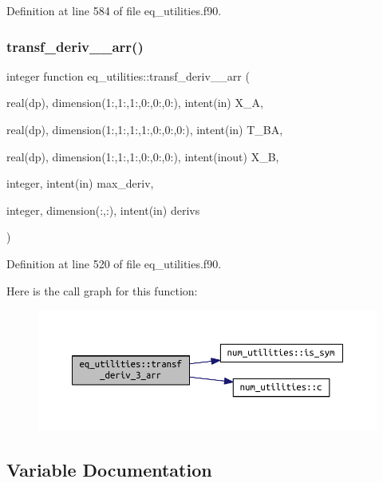 Definition at line 584 of file eq\+\_\+utilities.\+f90.

\mbox{\label{namespaceeq__utilities_ad7bf3c0a3d42efa072a70e8dffba5451}} 
\subsubsection{\texorpdfstring{transf\+\_\+deriv\+\_\+\_\+arr()}{transf\_deriv\_3\_arr()}}
{\footnotesize\ttfamily integer function eq\+\_\+utilities\+::transf\+\_\+deriv\+\_\+\_\+arr (\begin{DoxyParamCaption}\item[{real(dp), dimension(1\+:,1\+:,1\+:,0\+:,0\+:,0\+:), intent(in)}]{X\+\_\+A,  }\item[{real(dp), dimension(1\+:,1\+:,1\+:,1\+:,0\+:,0\+:,0\+:), intent(in)}]{T\+\_\+\+BA,  }\item[{real(dp), dimension(1\+:,1\+:,1\+:,0\+:,0\+:,0\+:), intent(inout)}]{X\+\_\+B,  }\item[{integer, intent(in)}]{max\+\_\+deriv,  }\item[{integer, dimension(\+:,\+:), intent(in)}]{derivs }\end{DoxyParamCaption})}



Definition at line 520 of file eq\+\_\+utilities.\+f90.

Here is the call graph for this function\+:
\nopagebreak
\begin{figure}[H]
\begin{center}
\leavevmode
\includegraphics[width=350pt]{namespaceeq__utilities_ad7bf3c0a3d42efa072a70e8dffba5451_cgraph}
\end{center}
\end{figure}


\subsection{Variable Documentation}
\mbox{\label{namespaceeq__utilities_aedf0e1858d0bd16218a290f4857d416a}} 
